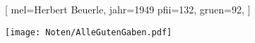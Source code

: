 [
    mel={Herbert Beuerle},
	jahr={1949}
	pfii={132},
    gruen={92}, 
]

\texttt{[image: Noten/AlleGutenGaben.pdf]}

\endsong

\beginscripture{}~\\
\endscripture